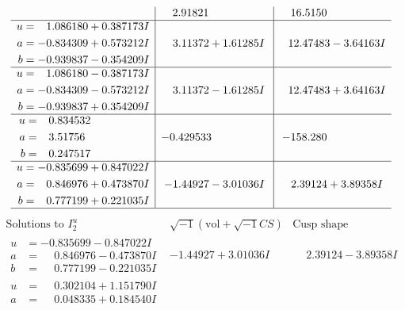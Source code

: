 \documentclass[1p]{elsarticle_modified}
\theoremstyle{definition}
\newcommand{\I}{\sqrt{-1}}
\begin{document}
$$\begin{array}{c|c|c}
 & \phantom{-}2.91821\phantom{ +0.000000I} & \phantom{-}16.5150\phantom{ +0.000000I} \\ \hline\begin{aligned}
u &= \phantom{-}1.086180 + 0.387173 I \\
a &= -0.834309 + 0.573212 I \\
b &= -0.939837 - 0.354209 I\end{aligned}
 & \phantom{-}3.11372 + 1.61285 I & \phantom{-}12.47483 - 3.64163 I \\ \hline\begin{aligned}
u &= \phantom{-}1.086180 - 0.387173 I \\
a &= -0.834309 - 0.573212 I \\
b &= -0.939837 + 0.354209 I\end{aligned}
 & \phantom{-}3.11372 - 1.61285 I & \phantom{-}12.47483 + 3.64163 I \\ \hline\begin{aligned}
u &= \phantom{-}0.834532\phantom{ +0.000000I} \\
a &= \phantom{-}3.51756\phantom{ +0.000000I} \\
b &= \phantom{-}0.247517\phantom{ +0.000000I}\end{aligned}
 & -0.429533\phantom{ +0.000000I} & -158.280\phantom{ +0.000000I} \\ \hline\begin{aligned}
u &= -0.835699 + 0.847022 I \\
a &= \phantom{-}0.846976 + 0.473870 I \\
b &= \phantom{-}0.777199 + 0.221035 I\end{aligned}
 & -1.44927 - 3.01036 I & \phantom{-}2.39124 + 3.89358 I\\
 \hline 
 \end{array}$$\newpage$$\begin{array}{c|c|c}  
\text{Solutions to }I^u_{2}& \I (\text{vol} + \sqrt{-1}CS) & \text{Cusp shape}\\
 \hline 
\begin{aligned}
u &= -0.835699 - 0.847022 I \\
a &= \phantom{-}0.846976 - 0.473870 I \\
b &= \phantom{-}0.777199 - 0.221035 I\end{aligned}
 & -1.44927 + 3.01036 I & \phantom{-}2.39124 - 3.89358 I \\ \hline\begin{aligned}
u &= \phantom{-}0.302104 + 1.151790 I \\
a &= \phantom{-}0.048335 + 0.184540 I \\

\end{aligned}
\end{array}$$
\end{document}
